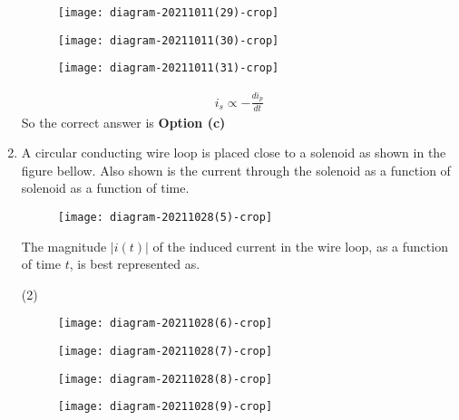 \begin{enumerate}
\begin{tasks}
\begin{figure}[H]
			\texttt{[image: diagram-20211011(29)-crop]}
		\end{figure}
		\task[\textbf{c.}] \begin{figure}[H]
			\centering
			\texttt{[image: diagram-20211011(30)-crop]}
		\end{figure}
		\task[\textbf{d.}] \begin{figure}[H]
			\centering
			\texttt{[image: diagram-20211011(31)-crop]}
		\end{figure}
	\end{tasks}
\begin{answer}
	\begin{align*}
	i_{s} \propto-\frac{d i_{p}}{d t}
	\end{align*}
	So the correct answer is \textbf{Option (c)}
\end{answer}
	\item A circular conducting wire loop is placed close to a solenoid as shown in the figure bellow. Also shown is the current through the solenoid as a function of solenoid as a function of time.\\
	\begin{figure}[H]
		\centering
		\texttt{[image: diagram-20211028(5)-crop]}
	\end{figure}
	The magnitude $|i(t)|$ of the induced current in the wire loop, as a function of time $t$, is best represented as.
	{}
	\begin{tasks}(2)
		\task[\textbf{a.}] \begin{figure}[H]
			\centering
			\texttt{[image: diagram-20211028(6)-crop]}
		\end{figure}
		\task[\textbf{b.}] \begin{figure}[H]
			\centering
			\texttt{[image: diagram-20211028(7)-crop]}
		\end{figure}
		\task[\textbf{c.}] \begin{figure}[H]
			\centering
			\texttt{[image: diagram-20211028(8)-crop]}
		\end{figure}
		\task[\textbf{d.}] \begin{figure}[H]
			\centering
			\texttt{[image: diagram-20211028(9)-crop]}
		\end{figure}
	\end{tasks}
\begin{answer}
	\begin{align*}

\end{align*}
\end{answer}
\end{enumerate}
